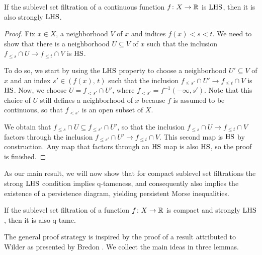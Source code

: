\begin{thm}\label{thm:hlc_to_strong_hlc}
    If the sublevel set filtration of a continuous function $f \colon X \to \mathbb{R}$ is $\mathrm{LHS}$, then it is also strongly $\mathrm{LHS}$.
\end{thm}
\begin{proof}
    Fix $x \in X$, a neighborhood $V$ of $x$ and indices $f(x) < s < t$.
	We need to show that there is a neighborhood $U \subseteq V$ of $x$ such that the inclusion $f_{\leq s} \cap U \to f_{\leq t} \cap V$ is $\mathrm{HS}$.
    
    To do so, we start by using the $\mathrm{LHS}$ property to choose a neighborhood $U' \subseteq V$ of $x$ and an index $s' \in (f(x),\, t)$ such that the inclusion $f_{\leq s'} \cap U' \to f_{\leq t} \cap V$ is $\mathrm{HS}$.
    Now, we choose $U = f_{< s'} \cap U'$, where $f_{< s'} = f^{-1} (-\infty, s')$.
    Note that this choice of $U$ still defines a neighborhood of $x$ because $f$ is assumed to be continuous, so that $f_{< s'}$ is an open subset of $X$.
    
    We obtain that $f_{\leq s} \cap U \subseteq f_{\leq s'} \cap U'$, so that the inclusion $f_{\leq s} \cap U \to f_{\leq t} \cap V$ factors through the inclusion $f_{\leq s'} \cap U' \to f_{\leq t} \cap V$.
	This second map is $\mathrm{HS}$ by construction.
	Any map that factors through an $\mathrm{HS}$ map is also $\mathrm{HS}$, so the proof is finished.
\end{proof}


As our main result, we will now show that for compact sublevel set filtrations the strong $\mathrm{LHS}$ condition implies \mbox{q-tameness}, and consequently also implies the existence of a persistence diagram, yielding persistent Morse inequalities.

\begin{thm} \label{t:strong local connectedness implies q-tameness}
	If the sublevel set filtration of a function $f \colon X \to \mathbb{R}$ is compact and strongly $\mathrm{LHS}$, then it is also q-tame.
\end{thm}

The general proof strategy is inspired by the proof of a result attributed to Wilder as presented by Bredon \cite[Section II.17]{Bredon.1997}.
We collect the main ideas in three lemmas.

